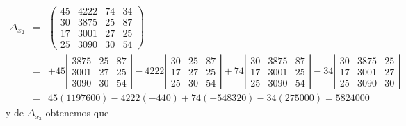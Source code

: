 \documentclass[12pt, landscape]{article}
\begin{document}
	\begin{eqnarray*}
		\Delta_{x_2} &=& \left(\begin{array}{rrrr}
							45 & 4222 & 74 & 34 \\
							30 & 3875 & 25 & 87 \\
							17 & 3001 & 27 & 25 \\
							25 & 3090 & 30 & 54
						\end{array}\right) \\
					&=&  +45 \left|\begin{array}{rrr}
						3875 & 25 & 87 \\
						3001 & 27 & 25 \\
						3090 & 30 & 54
					\end{array}\right| 
					-4222 \left|\begin{array}{rrr}
						30 & 25 & 87 \\
						17 & 27 & 25 \\
						25 & 30 & 54
					\end{array}\right| 
					+74 \left|\begin{array}{rrr}
						30 & 3875 & 87 \\
						17 & 3001 & 25 \\
						25 & 3090 & 54
					\end{array}\right| 
					-34 \left|\begin{array}{rrr}
						30 & 3875 & 25 \\
						17 & 3001 & 27 \\
						25 & 3090 & 30
					\end{array}\right| \\
					&=& 45(1197600) -4222(-440) +74(-548320) -34(275000) = 5824000
	\end{eqnarray*}
	y de $\Delta_{x_3}$ obtenemos que
\end{document}
